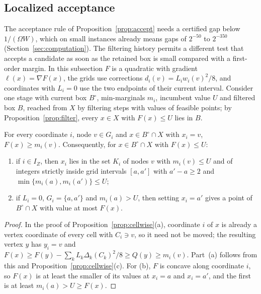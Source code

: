 \subsection{Localized acceptance}\label{sec:localized}
The acceptance rule of Proposition~\ref{prop:accept} needs a certified gap
below $1/(\Omega W)$, which on small instances already means gaps of
$2^{-50}$ to $2^{-350}$ (Section~\ref{sec:computation}). The filtering history
permits a different test that accepts a candidate as soon as the retained box
is small compared with a first-order margin. In this subsection $F$ is a
quadratic with gradient $\ell(x)=\nabla F(x)$, the grids use corrections
$d_i(v)=L_iw_i(v)^2/8$, and coordinates with $L_i=0$ use the two endpoints of
their current interval. Consider one stage with current box $B^\circ$,
min-marginals $m_i$, incumbent value $U$ and filtered box $B$, reached from $X$
by filtering steps with values of feasible points; by
Proposition~\ref{prop:filter}, every $x\in X$ with $F(x)\le U$ lies in $B$.

\begin{lemma}\label{lem:node}
For every coordinate $i$, node $v\in G_i$ and $x\in B^\circ\cap X$ with $x_i=v$,
$F(x)\ge m_i(v)$. Consequently, for $x\in B^\circ\cap X$ with $F(x)\le U$:
\begin{enumerate}[label=(\alph*)]
\item if $i\in I_Z$, then $x_i$ lies in the set $K_i$ of nodes $v$ with
$m_i(v)\le U$ and of integers strictly inside grid intervals $[a,a']$ with
$a'-a\ge2$ and $\min\{m_i(a),m_i(a')\}\le U$;
\item if $L_i=0$, $G_i=\{a,a'\}$ and $m_i(a)>U$, then setting $x_i=a'$ gives a
point of $B^\circ\cap X$ with value at most $F(x)$.
\end{enumerate}
\end{lemma}

\begin{proof}
In the proof of Proposition~\ref{prop:cellwise}(a), coordinate $i$ of $x$ is
already a vertex coordinate of every cell with $C_i\ni v$, so it need not be
moved; the resulting vertex $y$ has $y_i=v$ and
$F(x)\ge F(y)-\sum_kL_k\Delta_k(C_k)^2/8\ge Q(y)\ge m_i(v)$. Part~(a) follows from
this and Proposition~\ref{prop:cellwise}(c). For (b), $F$ is concave along
coordinate $i$, so $F(x)$ is at least the smaller of its values at $x_i=a$ and
$x_i=a'$, and the first is at least $m_i(a)>U\ge F(x)$.
\end{proof}

